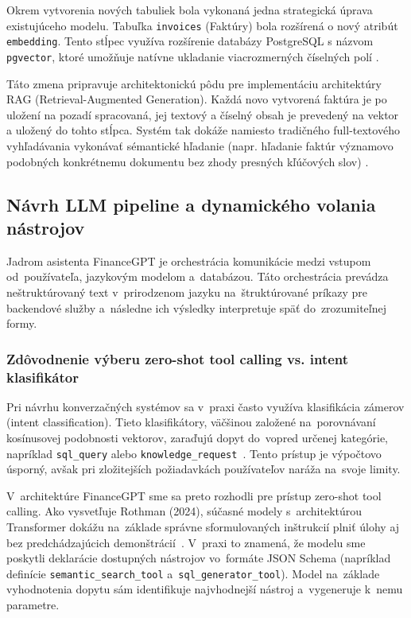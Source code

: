 Okrem vytvorenia nových tabuliek bola vykonaná jedna strategická úprava
existujúceho modelu. Tabuľka \texttt{invoices} (Faktúry) bola rozšírená o nový
atribút \texttt{embedding}. Tento stĺpec využíva rozšírenie databázy PostgreSQL
s názvom \texttt{pgvector}, ktoré umožňuje natívne ukladanie viacrozmerných
číselných polí \cite{rothman2024transformers}.

Táto zmena pripravuje architektonickú pôdu pre implementáciu architektúry RAG (Retrieval-Augmented
Generation). Každá novo vytvorená faktúra je po uložení na pozadí spracovaná,
jej textový a číselný obsah je prevedený na vektor a uložený do tohto stĺpca. Systém
tak dokáže namiesto tradičného full-textového vyhľadávania vykonávať sémantické hľadanie
(napr. hľadanie faktúr významovo podobných konkrétnemu dokumentu bez zhody presných
kľúčových slov) \cite{atkinson2025}.

\subsection{Návrh LLM pipeline a dynamického volania nástrojov}

Jadrom asistenta FinanceGPT je orchestrácia komunikácie medzi vstupom od~používateľa,
jazykovým modelom a~databázou. Táto orchestrácia prevádza neštruktúrovaný text v~prirodzenom
jazyku na~štruktúrované príkazy pre backendové služby a~následne ich výsledky interpretuje
späť do~zrozumiteľnej formy.

\subsubsection{Zdôvodnenie výberu zero-shot tool calling vs. intent klasifikátor}

Pri návrhu konverzačných systémov sa v~praxi často využíva klasifikácia zámerov
(intent classification). Tieto klasifikátory, väčšinou založené na~porovnávaní
kosínusovej podobnosti vektorov, zaraďujú dopyt do~vopred určenej kategórie,
napríklad \texttt{sql\_query} alebo \texttt{knowledge\_request}~\cite{atkinson2025}.
Tento prístup je výpočtovo úsporný, avšak pri zložitejších požiadavkách
používateľov naráža na~svoje limity.

V~architektúre FinanceGPT sme sa preto rozhodli pre prístup zero-shot tool
calling. Ako vysvetľuje Rothman (2024), súčasné modely s~architektúrou
Transformer dokážu na~základe správne sformulovaných inštrukcií plniť úlohy aj
bez predchádzajúcich demonštrácií~\cite{rothman2024transformers}. V~praxi to znamená,
že modelu sme poskytli deklarácie dostupných nástrojov vo~formáte JSON Schema (napríklad
definície \texttt{semantic\_search\_tool} a~\texttt{sql\_generator\_tool}). Model
na~základe vyhodnotenia dopytu sám identifikuje najvhodnejší nástroj a~vygeneruje
k~nemu parametre.

